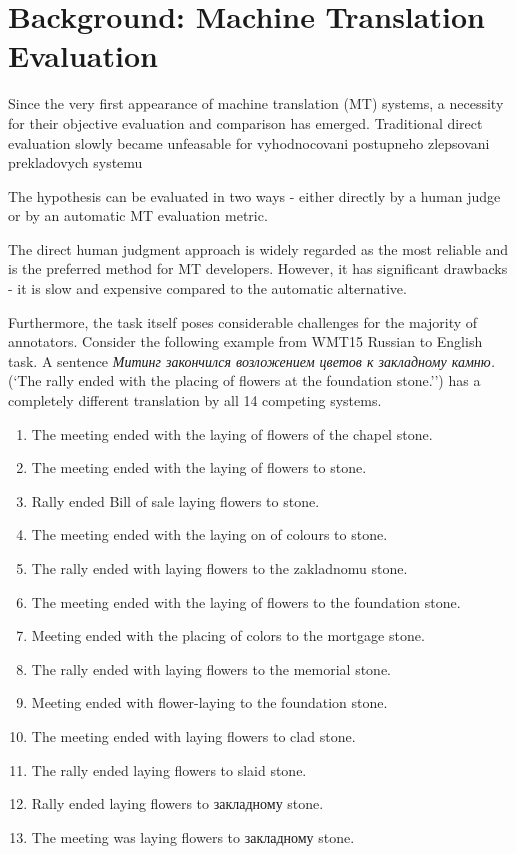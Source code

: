 \chapter{Background: Machine Translation Evaluation}

Since the very first appearance of machine translation (MT) systems, a necessity for their objective evaluation and comparison has emerged. Traditional direct evaluation slowly became unfeasable for vyhodnocovani postupneho zlepsovani prekladovych systemu 

The hypothesis can be evaluated in two ways - either directly by a human judge or by an automatic MT evaluation metric.

The direct human judgment approach is widely regarded as the most reliable and is the preferred method for MT developers. However, it has significant drawbacks - it is slow and expensive compared to the automatic alternative.

Furthermore, the task itself poses considerable challenges for the majority of annotators. Consider the following example from WMT15 \cite{wmt15} Russian to English task. A sentence \textit{Митинг закончился возложением цветов к закладному камню.} (`The rally ended with the placing of flowers at the foundation stone.'') has a completely different translation by all 14 competing systems. 

\begin{enumerate}
\item The meeting ended with the laying of flowers of the chapel stone.
\item The meeting ended with the laying of flowers to stone.
\item Rally ended Bill of sale laying flowers to stone.
\item The meeting ended with the laying on of colours to stone.
\item The rally ended with laying flowers to the zakladnomu stone.
\item The meeting ended with the laying of flowers to the foundation stone.
\item Meeting ended with the placing of colors to the mortgage stone.
\item The rally ended with laying flowers to the memorial stone.
\item Meeting ended with flower-laying to the foundation stone.
\item The meeting ended with laying flowers to clad stone.
\item The rally ended laying flowers to slaid stone.
\item Rally ended laying flowers to закладному stone.
\item The meeting was laying flowers to закладному stone.
\end{enumerate}

